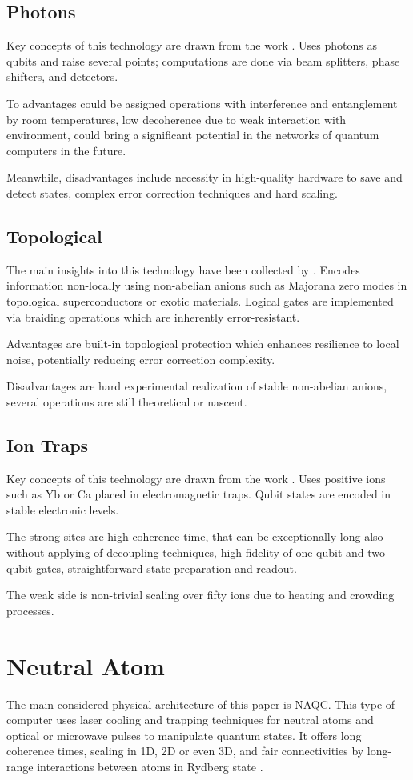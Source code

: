 \subsection{Photons}
Key concepts of this technology are drawn from the work \parencite{romero2024photonicquantumcomputing}.
Uses photons as qubits and raise several points; computations are done via beam splitters, phase shifters, and detectors.

To advantages could be assigned operations with interference and entanglement by room temperatures,
low decoherence due to weak interaction with environment,
could bring a significant potential in the networks of quantum computers in the future.

Meanwhile, disadvantages include necessity in high-quality hardware to save and detect states,
complex error correction techniques and hard scaling.

\subsection{Topological}
The main insights into this technology have been collected by \parencite{Lahtinen_2017, Zhang_2024}.
Encodes information non-locally using non-abelian anions such as Majorana zero modes in topological superconductors 
or exotic materials. 
Logical gates are implemented via braiding operations which are inherently error-resistant.


Advantages are built-in topological protection which enhances resilience to local noise, 
potentially reducing error correction complexity.

Disadvantages are hard experimental realization of stable non-abelian anions,
several operations are still theoretical or nascent.
\subsection{Ion Traps}
Key concepts of this technology are drawn from the work \parencite{Bruzewicz_2019}.
Uses positive ions such as Yb or Ca  placed in electromagnetic traps. 
Qubit states are encoded in stable electronic levels.

The strong sites are high coherence time, that can be exceptionally long also without applying of decoupling techniques,
high fidelity of one-qubit and two-qubit gates, straightforward state preparation and readout.

The weak side is non-trivial scaling over fifty ions due to heating and crowding processes.
\section{Neutral Atom}
The main considered physical architecture of this paper is \ac{NAQC}. 
This type of computer uses laser cooling and trapping techniques for neutral atoms and
optical or microwave pulses to manipulate quantum states.  
It offers long coherence times, scaling in 1D, 2D or even 3D,
and fair connectivities by long-range interactions between atoms in Rydberg state \parencite{Wintersperger_2023}.
